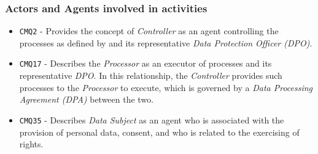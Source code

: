 \subsubsection{Actors and Agents involved in activities}
\begin{itemize} 
    \item \texttt{CMQ2} - Provides the concept of \textit{Controller} as an agent controlling the processes as defined by and its representative \textit{Data Protection Officer (DPO)}.
    \item \texttt{CMQ17} - Describes the \textit{Processor} as an executor of processes and its representative \textit{DPO}. In this relationship, the \textit{Controller} provides such processes to the \textit{Processor} to execute, which is governed by a \textit{Data Processing Agreement (DPA)} between the two.
    \item \texttt{CMQ35} - Describes \textit{Data Subject} as an agent who is associated with the provision of personal data, consent, and who is related to the exercising of rights.
\end{itemize}

